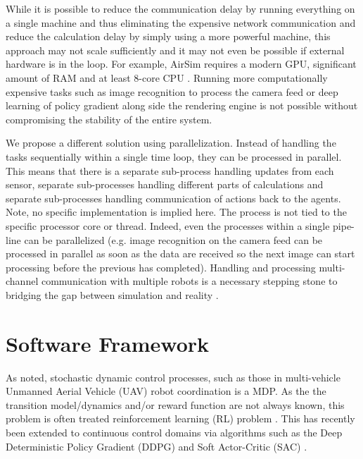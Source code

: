 \documentclass{article}
\let\cite\citep
\begin{document}
While it is possible to reduce the communication delay by running everything on a single machine and thus eliminating the expensive network communication and reduce the calculation delay by simply using a more powerful machine, this approach may not scale sufficiently and it may not even be possible if external hardware is in the loop.   For example, AirSim requires a modern GPU, significant amount of RAM and at least 8-core CPU \cite{shah2018airsim}. Running more computationally expensive tasks such as image recognition to process the camera feed or deep learning of policy gradient along side the rendering engine is not possible without compromising the stability of the entire system.

We propose a different solution using parallelization. Instead of handling the tasks sequentially within a single time loop, they can be processed in parallel. This means that there is a separate sub-process  %
handling updates from each sensor, separate sub-processes handling different parts of calculations and separate sub-processes handling communication of actions back to the agents.
Note, no specific implementation is implied here. The process is not tied to the specific processor core or thread.
Indeed, even the processes within a single pipe-line can be parallelized (e.g. image recognition on the camera feed can be processed in parallel as soon as the data are received so the next image can start processing before the previous has completed).
Handling and processing multi-channel communication with multiple robots is a necessary stepping stone to bridging the gap between simulation and reality \cite{loquercio2019deep, james2019sim}. %



\section{Software Framework}

As noted, stochastic dynamic control processes, such as those in multi-vehicle Unmanned Aerial Vehicle (UAV) robot coordination is a MDP.   As the the transition model/dynamics and/or reward function are not always known, this problem is often treated reinforcement learning (RL) problem \cite{sutton2018reinforcement}.  This has recently been extended to continuous control domains  \cite{henderson2018deep} via algorithms such as the Deep Deterministic Policy Gradient (DDPG) \cite{DDPG} and Soft Actor-Critic (SAC) \cite{SAC}.
\end{document}
